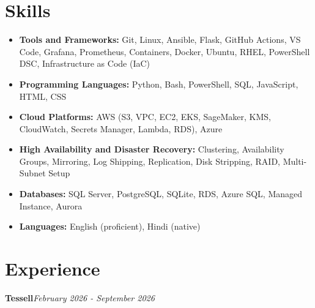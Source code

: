 \documentclass[10pt,a4paper]{article}
\begin{document}
\section{Skills}
\begin{itemize}
  \item \textbf{Tools and Frameworks:} Git, Linux, Ansible, Flask, GitHub Actions, VS Code, Grafana, Prometheus, Containers, Docker, Ubuntu, RHEL, PowerShell DSC, Infrastructure as Code (IaC)
  \item \textbf{Programming Languages:} Python, Bash, PowerShell, SQL, JavaScript, HTML, CSS
  \item \textbf{Cloud Platforms:} AWS (S3, VPC, EC2, EKS, SageMaker, KMS, CloudWatch, Secrets Manager, Lambda, RDS), Azure
  \item \textbf{High Availability and Disaster Recovery:} Clustering, Availability Groups, Mirroring, Log Shipping, Replication, Disk Stripping, RAID, Multi-Subnet Setup
  \item \textbf{Databases:} SQL Server, PostgreSQL, SQLite, RDS, Azure SQL, Managed Instance, Aurora
  \item \textbf{Languages:} English (proficient), Hindi (native)
\end{itemize}

\section{Experience}

\noindent\textbf{Tessell}\hfill \textit{February 2026 - September 2026}
\end{document}

